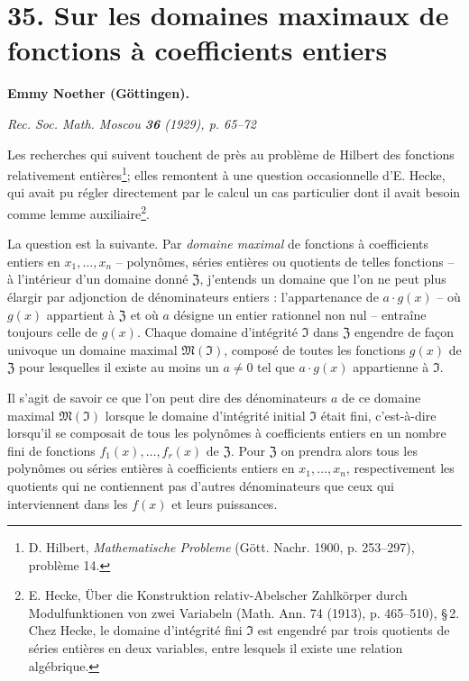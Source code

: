 \section*{35. Sur les domaines maximaux de fonctions à coefficients entiers}

\begin{center}
{\bfseries Emmy Noether (Göttingen).}\par
\emph{Rec. Soc. Math. Moscou \textbf{36} (1929), p. 65--72}
\end{center}

Les recherches qui suivent touchent de près au problème de Hilbert des fonctions relativement entières\footnote{D. Hilbert, \emph{Mathematische Probleme} (Gött. Nachr. 1900, p. 253--297), problème 14.}; elles remontent à une question occasionnelle d'E. Hecke, qui avait pu régler directement par le calcul un cas particulier dont il avait besoin comme lemme auxiliaire\footnote{E. Hecke, \og{} Über die Konstruktion relativ-Abelscher Zahlkörper durch Modulfunktionen von zwei Variabeln \fg{} (Math. Ann. 74 (1913), p. 465--510), \S\,2. Chez Hecke, le domaine d'intégrité fini $\mathfrak{I}$ est engendré par trois quotients de séries entières en deux variables, entre lesquels il existe une relation algébrique.}.

La question est la suivante. Par \emph{domaine maximal} de fonctions à coefficients entiers en $x_1,\ldots,x_n$ -- polynômes, séries entières ou quotients de telles fonctions -- à l'intérieur d'un domaine donné $\mathfrak{Z}$, j'entends un domaine que l'on ne peut plus élargir par adjonction de dénominateurs entiers : l'appartenance de $a\cdot g(x)$ -- où $g(x)$ appartient à $\mathfrak{Z}$ et où $a$ désigne un entier rationnel non nul -- entraîne toujours celle de $g(x)$. Chaque domaine d'intégrité $\mathfrak{I}$ dans $\mathfrak{Z}$ engendre de façon univoque un domaine maximal $\mathfrak{M}(\mathfrak{I})$, composé de toutes les fonctions $g(x)$ de $\mathfrak{Z}$ pour lesquelles il existe au moins un $a\ne0$ tel que $a\cdot g(x)$ appartienne à $\mathfrak{I}$.

Il s'agit de savoir ce que l'on peut dire des dénominateurs $a$ de ce domaine maximal $\mathfrak{M}(\mathfrak{I})$ lorsque le domaine d'intégrité initial $\mathfrak{I}$ était fini, c'est-à-dire lorsqu'il se composait de tous les polynômes à coefficients entiers en un nombre fini de fonctions $f_1(x),\ldots,f_r(x)$ de $\mathfrak{Z}$. Pour $\mathfrak{Z}$ on prendra alors tous les polynômes ou séries entières à coefficients entiers en $x_1,\ldots,x_n$, respectivement les quotients qui ne contiennent pas d'autres dénominateurs que ceux qui interviennent dans les $f(x)$ et leurs puissances.

